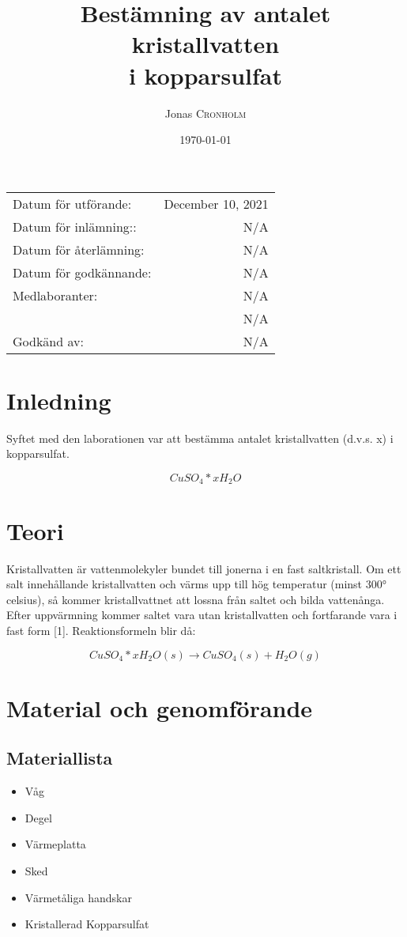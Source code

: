 \documentclass{article}
\title{Bestämning av antalet kristallvatten \\i kopparsulfat} %
\author{Jonas \textsc{Cronholm}} %
\date{\today} %
\begin{document}
	
	\maketitle %
	
	\begin{center}
		\begin{tabular}{l r}
			Datum för utförande: & December 10, 2021 \\ %
			Datum för inlämning:: & N/A \\
			Datum för återlämning: & N/A \\
			Datum för godkännande: & N/A \\
			Medlaboranter: & N/A \\ %
			& N/A \\
			Godkänd av: &  N/A%
		\end{tabular}
	\end{center}
	\pagebreak
	
	\section{Inledning}
	Syftet med den laborationen var att bestämma antalet kristallvatten (d.v.s. x) i kopparsulfat.
	
	\[CuSO_4 * xH_2O \]
	\section{Teori}
	Kristallvatten är vattenmolekyler bundet till jonerna i en fast saltkristall. Om ett salt innehållande kristallvatten och värms upp till hög temperatur (minst 300° celsius), så kommer kristallvattnet att lossna från saltet och bilda vattenånga. Efter uppvärmning kommer saltet vara utan kristallvatten och fortfarande vara i fast form [1]. Reaktionsformeln blir då:
	
	\[CuSO_4 * xH_2O(s) \longrightarrow CuSO_4(s) + H_2O(g) \]
	\section{Material och genomförande}
	\subsection{Materiallista}
	\begin{itemize}
		\item Våg
		\item Degel
		\item Värmeplatta
		\item Sked
		\item Värmetåliga handskar
		\item Kristallerad Kopparsulfat 
	\end{itemize}
	\pagebreak
\end{document}
